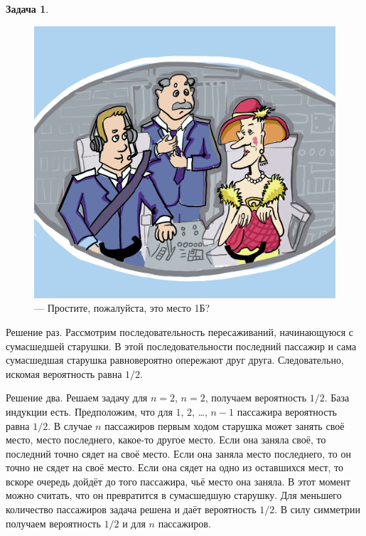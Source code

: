 \documentclass[nobib]{tufte-handout}
\theoremstyle{definition}
\newtheorem{problem}{Задача}
\begin{document}
\begin{problem}
\begin{figure}
  \includegraphics[width=17cm]{images/crazy_woman.jpg}
  \caption{— Простите, пожалуйста, это место 1Б?}
\end{figure}


\begin{sol}
Решение раз. Рассмотрим последовательность пересаживаний, начинающуюся с сумасшедшей старушки. В этой последовательности последний пассажир и сама сумасшедшая старушка равновероятно опережают друг друга. Следовательно, искомая вероятность равна $1/2$.

Решение два. Решаем задачу для $n=2$, $n=2$, получаем вероятность $1/2$. База индукции есть. Предположим, что для $1$, $2$, \ldots, $n-1$ пассажира вероятность равна $1/2$. В случае $n$ пассажиров первым ходом старушка может занять своё место, место последнего, какое-то другое место. Если она заняла своё, то последний точно сядет на своё место. Если она заняла место последнего, то он точно не сядет на своё место. Если она сядет на одно из оставшихся мест, то вскоре очередь дойдёт до того пассажира, чьё место она заняла. В этот момент можно считать, что он превратится в сумасшедшую старушку. Для меньшего количество пассажиров задача решена и даёт вероятность $1/2$. В силу симметрии получаем вероятность $1/2$ и для $n$ пассажиров.
\end{sol}

\end{problem}
\end{document}
